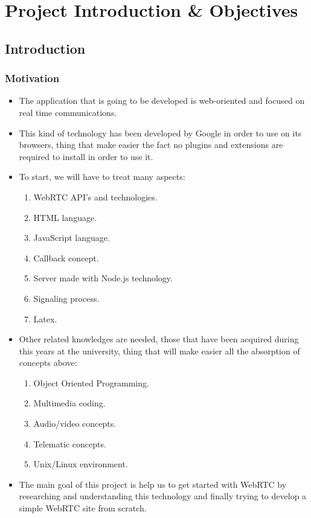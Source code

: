 

\section{Project Introduction \& Objectives}
\subsection{Introduction}

\begin{frame}\frametitle{Motivation}
\begin{itemize}
\item The application that is going to be developed is web-oriented and focused on real time
communications. 
\item This kind of technology has been developed by Google in order to use on its browsers, thing that make easier
the fact no plugins and extensions are required to install in order to use it.
\item To start,  we will have to treat many aspects: %
  \begin{enumerate}
  \item WebRTC API's and technologies.
  \item HTML language.
  \item JavaScript language.
  \item Callback concept.
  \item Server made with Node.js technology.
  \item Signaling process.
  \item Latex.
  \end{enumerate}
\end{itemize}
\framebreak
\begin{itemize}

\item Other related knowledges are needed, those that have been acquired during this years
at the university, thing that will make easier all the absorption of concepts above:

  \begin{enumerate}
  \item Object Oriented Programming.
  \item Multimedia coding.
  \item Audio/video concepts.
  \item Telematic concepts.
  \item Unix/Linux environment.
  \end{enumerate}

\item The main goal of this project is help us to get started with WebRTC by researching and
understanding this technology and finally trying to develop a simple WebRTC site from scratch.

\end{itemize}
\end{frame}
\clearpage

